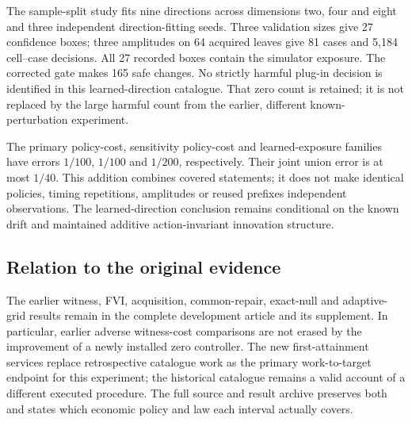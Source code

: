 
The sample-split study fits nine directions across dimensions two, four and eight and three independent direction-fitting seeds. Three validation sizes give 27 confidence boxes; three amplitudes on 64 acquired leaves give 81 cases and 5,184 cell--case decisions. All 27 recorded boxes contain the simulator exposure. The corrected gate makes 165 safe changes. No strictly harmful plug-in decision is identified in this learned-direction catalogue. That zero count is retained; it is not replaced by the large harmful count from the earlier, different known-perturbation experiment.

The primary policy-cost, sensitivity policy-cost and learned-exposure families have errors $1/100$, $1/100$ and $1/200$, respectively. Their joint union error is at most $1/40$. This addition combines covered statements; it does not make identical policies, timing repetitions, amplitudes or reused prefixes independent observations. The learned-direction conclusion remains conditional on the known drift and maintained additive action-invariant innovation structure.

\subsection{Relation to the original evidence}\label{sec:legacy56}
The earlier witness, FVI, acquisition, common-repair, exact-null and adaptive-grid results remain in the complete development article and its supplement. In particular, earlier adverse witness-cost comparisons are not erased by the improvement of a newly installed zero controller. The new first-attainment services replace retrospective catalogue work as the primary work-to-target endpoint for this experiment; the historical catalogue remains a valid account of a different executed procedure. The full source and result archive preserves both and states which economic policy and law each interval actually covers.
